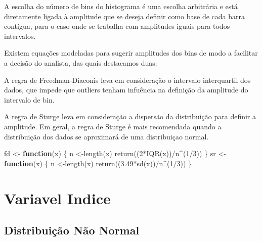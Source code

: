 \documentclass[
]{article}
\newenvironment{Shaded}{\begin{snugshade}}{\end{snugshade}}
\newcommand{\ControlFlowTok}[1]{\textcolor[rgb]{0.13,0.29,0.53}{\textbf{#1}}}
\newcommand{\DecValTok}[1]{\textcolor[rgb]{0.00,0.00,0.81}{#1}}
\newcommand{\FloatTok}[1]{\textcolor[rgb]{0.00,0.00,0.81}{#1}}
\newcommand{\FunctionTok}[1]{\textcolor[rgb]{0.00,0.00,0.00}{#1}}
\newcommand{\NormalTok}[1]{#1}
\newcommand{\OtherTok}[1]{\textcolor[rgb]{0.56,0.35,0.01}{#1}}
\newcommand{\SpecialCharTok}[1]{\textcolor[rgb]{0.00,0.00,0.00}{#1}}
\begin{document}
A escolha do número de bins do histograma é uma escolha arbitrária e
está diretamente ligada à amplitude que se deseja definir como base de
cada barra contígua, para o caso onde se trabalha com amplitudes iguais
para todos intervalos.

Existem equações modeladas para sugerir amplitudes dos bins de modo a
facilitar a decisão do analista, das quais destacamos duas:

A regra de Freedman-Diaconis leva em consideração o intervalo
interquartil dos dados, que impede que outliers tenham infuência na
definição da amplitude do intervalo de bin.

A regra de Sturge leva em consideração a dispersão da distribuição para
definir a amplitude. Em geral, a regra de Sturge é mais recomendada
quando a distribuição dos dados se aproximará de uma distribuiçao
normal.

\begin{Shaded}
\begin{Highlighting}[]
\NormalTok{fd }\OtherTok{\textless{}{-}} \ControlFlowTok{function}\NormalTok{(x) \{}
\NormalTok{  n }\OtherTok{\textless{}{-}}\FunctionTok{length}\NormalTok{(x)}
  \FunctionTok{return}\NormalTok{((}\DecValTok{2}\SpecialCharTok{*}\FunctionTok{IQR}\NormalTok{(x))}\SpecialCharTok{/}\NormalTok{n}\SpecialCharTok{\^{}}\NormalTok{(}\DecValTok{1}\SpecialCharTok{/}\DecValTok{3}\NormalTok{))}
\NormalTok{\}}
\NormalTok{sr }\OtherTok{\textless{}{-}} \ControlFlowTok{function}\NormalTok{(x) \{}
\NormalTok{  n }\OtherTok{\textless{}{-}}\FunctionTok{length}\NormalTok{(x)}
  \FunctionTok{return}\NormalTok{((}\FloatTok{3.49}\SpecialCharTok{*}\FunctionTok{sd}\NormalTok{(x))}\SpecialCharTok{/}\NormalTok{n}\SpecialCharTok{\^{}}\NormalTok{(}\DecValTok{1}\SpecialCharTok{/}\DecValTok{3}\NormalTok{))}
\NormalTok{  \}}
\end{Highlighting}
\end{Shaded}

\hypertarget{variavel-indice}{%
\section{Variavel Indice}\label{variavel-indice}}

\hypertarget{distribuiuxe7uxe3o-nuxe3o-normal}{%
\subsection{Distribuição Não
Normal}\label{distribuiuxe7uxe3o-nuxe3o-normal}}
\end{document}

